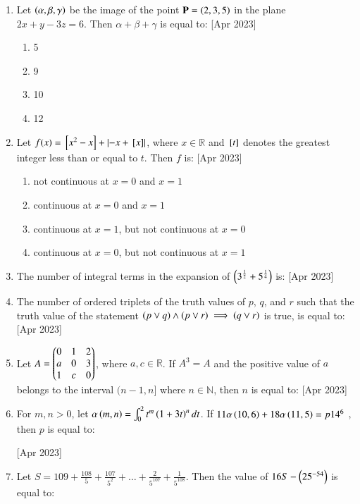 \documentclass[journal]{IEEEtran}
\begin{document}
\begin{enumerate}
	\item 
	Let $\left(\alpha, \beta, \gamma\right)$ be the image of the point $\mathbf{P} = \left(2, 3, 5\right)$ in the plane $2x + y - 3z = 6$. Then $\alpha + \beta + \gamma$ is equal to:
	\hfill [Apr 2023]
		\begin{enumerate}
			\item 5
			\item 9
			\item 10
			\item 12
		\end{enumerate}

	\item
	Let $f(x) = {}\left[x^2 - x\right] + \left\vert-x + {}\left[x\right]\right\vert$, where $x \in \mathbb{R}$ and ${}\left[t\right]$ denotes the greatest integer less than or equal to $t$. Then $f$ is:
	\hfill [Apr 2023]
		\begin{enumerate}
			\item not continuous at $x = 0$ and $x = 1$
			\item continuous at $x = 0$ and $x = 1$
			\item continuous at $x = 1$, but not continuous at $x = 0$
			\item continuous at $x = 0$, but not continuous at $x = 1$
		\end{enumerate}

	\item 
	The number of integral terms in the expansion of $\left(3^{\frac{1}{2}} + 5^{\frac{1}{4}}\right)$ is:
	\hfill [Apr 2023]

	\item 
	The number of ordered triplets of the truth values of $p$, $q$, and $r$ such that the truth value of the statement $\left(p \lor q\right) \land \left(p \lor r\right) \implies \left(q \lor r\right)$ is true, is equal to:
	\hfill [Apr 2023]

	\item
	Let $A = \begin{pmatrix}0 & 1 & 2 \\ a & 0 & 3 \\ 1 & c & 0\end{pmatrix}$, where $a, c \in \mathbb{R}$. If $A^{3} = A$ and the positive value of $a$ belongs to the interval $(n-1,n]$ where $n \in \mathbb{N}$, then $n$ is equal to:
	\hfill [Apr 2023]
	
	\item 
	For $m, n > 0$, let $\alpha\left(m, n\right) = \int_{0}^{2} t^{m}\left(1+3t\right)^{n} dt$. If $11\alpha\left(10, 6\right) + 18\alpha\left(11, 5\right) = p 14^{6}$ , then $p$ is equal to:
	
	\hfill [Apr 2023]
	
	\item 
	Let $S = 109 + \frac{108}{5} + \frac{107}{5^2} + \dots + \frac{2}{5^{107}} + \frac{1}{5^{108}}$. Then the value of $16S - \left(25^{-54}\right)$ is equal to:
	

\end{enumerate}
\end{document}
